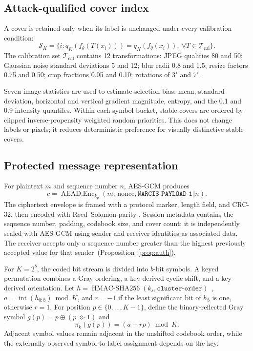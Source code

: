 ﻿\documentclass[10pt,journal]{IEEEtran}
\begin{document}
\subsection{Attack-qualified cover index}

A cover is retained only when its label is unchanged under every
calibration condition:
\begin{equation}
\mathcal{S}_K=
\bigl\{i:q_K(f_\theta(T(x_i)))=q_K(f_\theta(x_i)),
\ \forall T\in\mathcal{T}_{\mathrm{cal}}\bigr\}.
\label{eq:stable}
\end{equation}
The calibration set $\mathcal{T}_{\mathrm{cal}}$ contains 12
transformations: JPEG qualities 80 and 50; Gaussian noise standard
deviations 5 and 12; blur radii 0.8 and 1.5; resize factors 0.75
and 0.50; crop fractions 0.05 and 0.10; rotations of $3^\circ$
and $7^\circ$.

Seven image statistics are used to estimate selection bias: mean,
standard deviation, horizontal and vertical gradient magnitude,
entropy, and the 0.1 and 0.9 intensity quantiles. Within each symbol
bucket, stable covers are ordered by clipped inverse-propensity
weighted random priorities. This does not change labels or pixels; it
reduces deterministic preference for visually distinctive stable covers.

\subsection{Protected message representation}

For plaintext $m$ and sequence number $n$, AES-GCM produces
\begin{equation}
c=\operatorname{AEAD.Enc}_{k_p}(m;\,\mathrm{nonce},
\texttt{NARCIS-PAYLOAD-1}\Vert n).
\end{equation}
The ciphertext envelope is framed with a protocol marker, length field,
and CRC-32, then encoded with Reed--Solomon parity
\cite{reed1960polynomial}. Session metadata contains the sequence
number, padding, codebook size, and cover count; it is independently
sealed with AES-GCM using sender and receiver identities as associated
data. The receiver accepts only a sequence number greater than the
highest previously accepted value for that sender~(Proposition~\ref{prop:auth}).

For $K=2^b$, the coded bit stream is divided into $b$-bit symbols. A
keyed permutation combines a Gray ordering, a key-derived cyclic shift,
and a key-derived orientation. Let
$h=\operatorname{HMAC\text{-}SHA256}(k_s,\texttt{cluster-order})$~\cite{nist2008hmac},
$a=\operatorname{int}(h_{0:8})\bmod K$, and $r{=}{-1}$ if the least
significant bit of $h_8$ is one, otherwise $r{=}1$. For position
$p\in\{0,\ldots,K-1\}$, define the binary-reflected Gray symbol
$g(p)=p\oplus(p\!\gg\!1)$ and
\begin{equation}
\pi_k(g(p))=(a+rp)\bmod K.
\label{eq:keyedgray}
\end{equation}
Adjacent symbol values remain adjacent in the unshifted codebook order,
while the externally observed symbol-to-label assignment depends on the
key.
\end{document}
